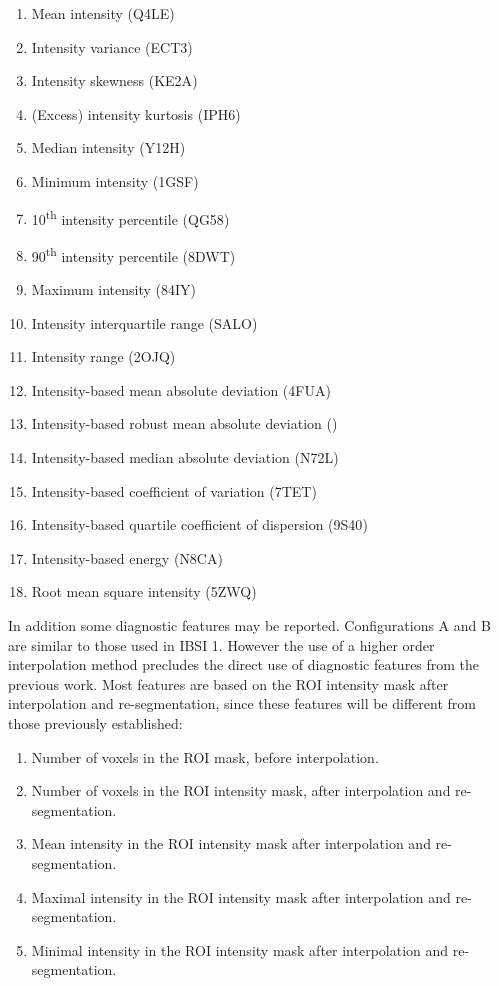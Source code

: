 \documentclass[fleqn,a4paper,oneside,openany]{book}
\newcommand\textid[1]{{\normalsize{\idfont #1}}}
\begin{document}
\begin{enumerate}
    \item Mean intensity (\textid{Q4LE})
    \item Intensity variance (\textid{ECT3})
    \item Intensity skewness (\textid{KE2A})
    \item (Excess) intensity kurtosis (\textid{IPH6})
    \item Median intensity (\textid{Y12H})
    \item Minimum intensity (\textid{1GSF})
    \item 10\textsuperscript{th} intensity percentile (\textid{QG58})
    \item 90\textsuperscript{th} intensity percentile (\textid{8DWT})
    \item Maximum intensity (\textid{84IY})
    \item Intensity interquartile range (\textid{SALO})
    \item Intensity range (\textid{2OJQ})
    \item Intensity-based mean absolute deviation (\textid{4FUA})
    \item Intensity-based robust mean absolute deviation (\textid{1128})
    \item Intensity-based median absolute deviation (\textid{N72L})
    \item Intensity-based coefficient of variation (\textid{7TET})
    \item Intensity-based quartile coefficient of dispersion (\textid{9S40})
    \item Intensity-based energy (\textid{N8CA})
    \item Root mean square intensity (\textid{5ZWQ})
\end{enumerate}

In addition some diagnostic features may be reported. Configurations A and B are similar to those used in IBSI 1. However the use of a higher order interpolation method precludes the direct use of diagnostic features from the previous work. Most features are based on the ROI intensity mask after interpolation and re-segmentation, since these features will be different from those previously established:
\begin{enumerate}
    \item Number of voxels in the ROI mask, before interpolation.
    \item Number of voxels in the ROI intensity mask, after interpolation and re-segmentation.
    \item Mean intensity in the ROI intensity mask after interpolation and re-segmentation.
    \item Maximal intensity in the ROI intensity mask after interpolation and re-segmentation.
    \item Minimal intensity in the ROI intensity mask after interpolation and re-segmentation.
\end{enumerate}
\end{document}
